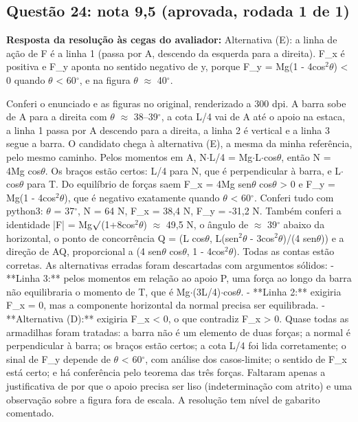 \documentclass{article}%
\begin{document}
\subsection*{Questão 24: nota 9,5 (aprovada, rodada 1 de 1)}%
\textbf{Resposta da resolução às cegas do avaliador:} Alternativa (E): a linha de ação de F é a linha 1 (passa por A, descendo da esquerda para a direita). F\_x é positiva e F\_y aponta no sentido negativo de y, porque F\_y = Mg(1 - 4cos$^2$$\theta$) < 0 quando $\theta$ < 60$^\circ$, e na figura $\theta$ $\approx$ 40$^\circ$.\par %
Conferi o enunciado e as figuras no original, renderizado a 300 dpi. A barra sobe de A para a direita com $\theta$ $\approx$ 38--39$^\circ$, a cota L/4 vai de A até o apoio na estaca, a linha 1 passa por A descendo para a direita, a linha 2 é vertical e a linha 3 segue a barra. O candidato chega à alternativa (E), a mesma da minha referência, pelo mesmo caminho.\newline%
\newline%
Pelos momentos em A, N$\cdot$L/4 = Mg$\cdot$L$\cdot$cos$\theta$, então N = 4Mg cos$\theta$. Os braços estão certos: L/4 para N, que é perpendicular à barra, e L$\cdot$cos$\theta$ para T. Do equilíbrio de forças saem F\_x = 4Mg sen$\theta$ cos$\theta$ > 0 e F\_y = Mg(1 - 4cos$^2$$\theta$), que é negativo exatamente quando $\theta$ < 60$^\circ$. Conferi tudo com python3: $\theta$ = 37$^\circ$, N = 64 N, F\_x = 38,4 N, F\_y = -31,2 N. Também conferi a identidade |F| = Mg$\surd$(1+8cos$^2$$\theta$) $\approx$ 49,5 N, o ângulo de $\approx$ 39$^\circ$ abaixo da horizontal, o ponto de concorrência Q = (L cos$\theta$, L(sen$^2$$\theta$ - 3cos$^2$$\theta$)/(4 sen$\theta$)) e a direção de AQ, proporcional a (4 sen$\theta$ cos$\theta$, 1 - 4cos$^2$$\theta$). Todas as contas estão corretas.\newline%
\newline%
As alternativas erradas foram descartadas com argumentos sólidos:\newline%
{-} **Linha 3:** pelos momentos em relação ao apoio P, uma força ao longo da barra não equilibraria o momento de T, que é Mg$\cdot$(3L/4)$\cdot$cos$\theta$.\newline%
{-} **Linha 2:** exigiria F\_x = 0, mas a componente horizontal da normal precisa ser equilibrada.\newline%
{-} **Alternativa (D):** exigiria F\_x < 0, o que contradiz F\_x > 0.\newline%
\newline%
Quase todas as armadilhas foram tratadas: a barra não é um elemento de duas forças; a normal é perpendicular à barra; os braços estão certos; a cota L/4 foi lida corretamente; o sinal de F\_y depende de $\theta$ < 60$^\circ$, com análise dos casos{-}limite; o sentido de F\_x está certo; e há conferência pelo teorema das três forças. Faltaram apenas a justificativa de por que o apoio precisa ser liso (indeterminação com atrito) e uma observação sobre a figura fora de escala. A resolução tem nível de gabarito comentado.%
\end{document}
